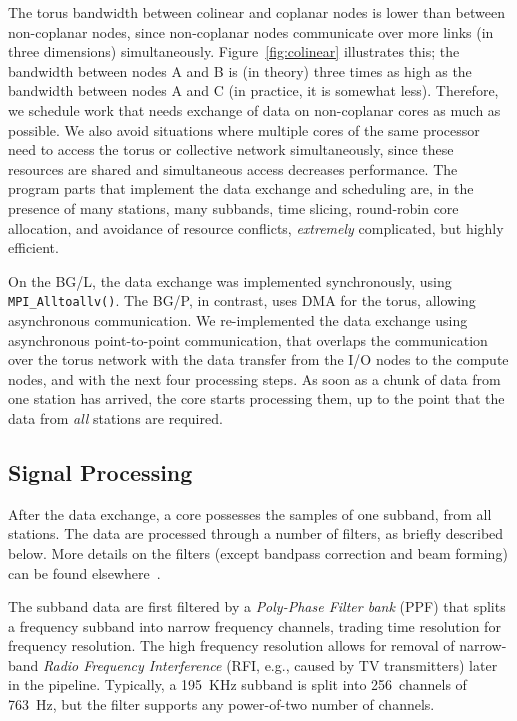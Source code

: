 \documentclass[10pt]{article}
\begin{document}
The torus bandwidth between colinear and coplanar nodes is lower than between
non-coplanar nodes, since non-coplanar nodes communicate over more links
(in three dimensions) simultaneously.
Figure~\ref{fig:colinear} illustrates this; the bandwidth between nodes
\textsf{A} and \textsf{B} is (in theory) three times as high as the bandwidth
between nodes \textsf{A} and \textsf{C} (in practice, it is somewhat less).
Therefore, we schedule work that needs exchange of data 
on non-coplanar cores as much as possible.
We also avoid situations where multiple cores of the same processor need to
access the torus or collective network simultaneously, since these resources
are shared and simultaneous access decreases performance.
The program parts that implement the data exchange and scheduling are, in the
presence of many stations, many subbands, time slicing, round-robin core
allocation, and avoidance of resource conflicts, \emph{extremely\/}
complicated, but highly efficient.

On the BG/L, the data exchange was implemented synchronously, using
\texttt{MPI\_Alltoallv()}.
The BG/P, in contrast, uses DMA for the torus, allowing asynchronous
communication.
We re-implemented the data exchange using asynchronous point-to-point
communication, that overlaps the communication over the torus network with 
the data transfer from the I/O nodes to the compute nodes, and with
the next four processing steps.
As soon as a chunk of data from one station has arrived, the core starts
processing them, up to the point that the data from \emph{all\/} stations
are required.


\subsection{Signal Processing}
\label{sec:signal-processing}

After the data exchange, a core possesses the samples of one subband, from all
stations.
The data are processed through a number of filters, as briefly described below.
More details on the filters (except bandpass correction and beam forming)
can be found elsewhere~\cite{Romein:06}.

The subband data are first filtered by a \emph{Poly-Phase Filter bank\/} (PPF) that
splits a frequency subband into narrow frequency channels, trading time
resolution for frequency resolution.
The high frequency resolution allows for removal of narrow-band
\emph{Radio Frequency Interference\/} (RFI, e.g., caused by TV transmitters)
later in the pipeline.
Typically, a 195~KHz subband is split into 256~channels of 763~Hz, but the
filter supports any power-of-two number of channels.
\end{document}
